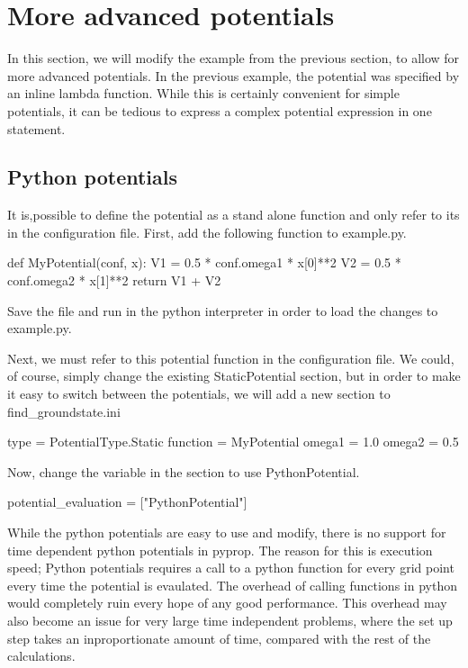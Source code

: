 \section{More advanced potentials}
In this section, we will modify the example from the previous section, to allow for more advanced 
potentials. In the previous example, the potential was specified by an inline lambda function. While
this is certainly convenient for simple potentials, it can be tedious to express a complex potential 
expression in one statement. 

\subsection{Python potentials}
It is,possible to define the potential as a stand alone function 
and only refer to its in the configuration file. First, add the following function to example.py.
\begin{python}
	def MyPotential(conf, x):
	    V1 = 0.5 * conf.omega1 * x[0]**2
	    V2 = 0.5 * conf.omega2 * x[1]**2
	    return V1 + V2
\end{python}
Save the file and run  in the python interpreter in order to load the 
changes to example.py.

Next, we must refer to this potential function in the configuration file. We could, of course, 
simply change the existing StaticPotential section, but in order to make it easy to switch between
the potentials, we will add a new section to find\_groundstate.ini
\begin{python}
	[PythonPotential]
	type = PotentialType.Static
	function = MyPotential
	omega1 = 1.0
	omega2 = 0.5
\end{python}
Now, change the  variable in the  section to use PythonPotential.
\begin{python}
	potential_evaluation = ["PythonPotential"]
\end{python}

While the python potentials are easy to use and modify, there is no support for time dependent python potentials 
in pyprop. The reason for this is execution speed; Python potentials requires a call to a python function for every
grid point every time the potential is evaulated. The overhead of calling functions in python would completely ruin
every hope of any good performance. This overhead may also become an issue for very large time independent problems,
where the set up step takes an inproportionate amount of time, compared with the rest of the calculations.


